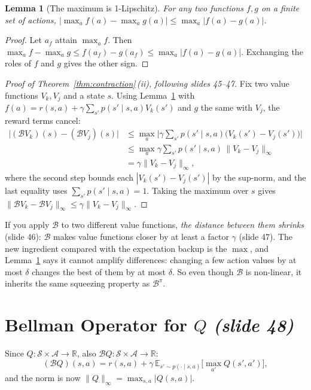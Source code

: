 \documentclass[11pt,a4paper]{article}
\newcommand{\R}{\mathbb{R}}
\newcommand{\E}{\mathbb{E}}
\newcommand{\cS}{\mathcal{S}}
\newcommand{\cA}{\mathcal{A}}
\newcommand{\Bell}{\mathcal{B}}
\newcommand{\Bpi}{\mathcal{B}^{\pi}}
\newcommand{\norm}[1]{\lVert #1\rVert_\infty}
\newcommand{\abs}[1]{\left\lvert #1\right\rvert}
\newcommand{\slide}[1]{\texorpdfstring{\emph{(slide #1)}}{(slide #1)}}
\theoremstyle{plain}
\newtheorem{lemma}{Lemma}\renewcommand{\thelemma}{L\arabic{lemma}}
\theoremstyle{definition}
\theoremstyle{remark}
\begin{document}
\begin{lemma}[The maximum is 1-Lipschitz]\label{lem:max}
For any two functions $f,g$ on a finite set of actions, $\big|\max_af(a)-\max_ag(a)\big|\le\max_a\abs{f(a)-g(a)}$.
\end{lemma}
\begin{proof}
Let $a_f$ attain $\max_af$. Then $\max_af-\max_ag\le f(a_f)-g(a_f)\le\max_a\abs{f(a)-g(a)}$. Exchanging the roles of $f$ and $g$ gives the other sign.
\end{proof}

\begin{proof}[Proof of Theorem~\ref{thm:contraction}\,(ii), following slides 45--47]
Fix two value functions $V_k,V_j$ and a state $s$. Using Lemma~\ref{lem:max} with $f(a)=r(s,a)+\gamma\sum_{s'}p(s'\mid s,a)V_k(s')$ and $g$ the same with $V_j$, the reward terms cancel:
\begin{align*}
\big|(\Bell V_k)(s)-(\Bell V_j)(s)\big|
&\le\max_a\Big|\gamma\sum_{s'}p(s'\mid s,a)\big(V_k(s')-V_j(s')\big)\Big|\\
&\le\max_a\gamma\sum_{s'}p(s'\mid s,a)\,\norm{V_k-V_j}\\
&=\gamma\norm{V_k-V_j},
\end{align*}
where the second step bounds each $\abs{V_k(s')-V_j(s')}$ by the sup-norm, and the last equality uses $\sum_{s'}p(s'\mid s,a)=1$. Taking the maximum over $s$ gives $\norm{\Bell V_k-\Bell V_j}\le\gamma\norm{V_k-V_j}$.
\end{proof}

\begin{intuition}
If you apply $\Bell$ to two different value functions, \emph{the distance between them shrinks} (slide 46): $\Bell$ makes value functions closer by at least a factor $\gamma$ (slide 47). The new ingredient compared with the expectation backup is the $\max$, and Lemma~\ref{lem:max} says it cannot amplify differences: changing a few action values by at most $\delta$ changes the best of them by at most $\delta$. So even though $\Bell$ is non-linear, it inherits the same squeezing property as $\Bpi$.
\end{intuition}

\section{Bellman Operator for $Q$ \slide{48}}
Since $Q:\cS\times\cA\to\R$, also $\Bell Q:\cS\times\cA\to\R$:
\[
(\Bell Q)(s,a)=r(s,a)+\gamma\,\E_{s'\sim p(\cdot\mid s,a)}\Big[\max_{a'}Q(s',a')\Big],
\]
and the norm is now $\norm{Q}=\max_{s,a}\abs{Q(s,a)}$.
\end{document}
